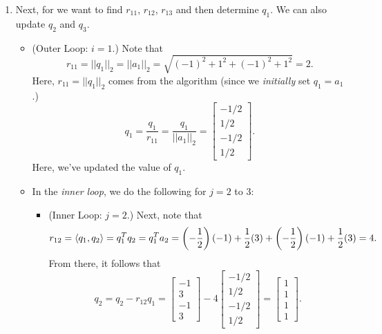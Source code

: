 \documentclass[letterpaper]{article}
\newcommand{\0}{\mathbf{0}}
\begin{document}
\begin{mdframed}
\begin{enumerate}
        \item Next, for we want to find $r_{11}$, $r_{12}$, $r_{13}$ and then determine $q_1$. We can also update $q_2$ and $q_3$. 
        
        \begin{itemize}
            \item (Outer Loop: $i = 1$.) Note that 
            \[r_{11} = ||q_1||_2 = ||a_1||_2 = \sqrt{(-1)^2 + 1^2 + (-1)^2 + 1^2} = 2.\]
            Here, $r_{11} = ||q_1||_2$ comes from the algorithm (since we \emph{initially} set $q_1 = a_1$.)
            \[q_1 = \frac{q_1}{r_{11}} = \frac{q_1}{||a_1||_2} = \begin{bmatrix}
                -1/2 \\ 1/2 \\ -1/2 \\ 1/2
            \end{bmatrix}.\]
            Here, we've updated the value of $q_1$. 
    
            \item In the \emph{inner loop}, we do the following for $j = 2$ to $3$:
            \begin{itemize}
                \item (Inner Loop: $j = 2$.) Next, note that 
                \[r_{12} = \langle q_1, q_2 \rangle = q_1^T q_2 = q_1^T a_2 = \left(-\frac{1}{2}\right)(-1) + \frac{1}{2}(3) + \left(-\frac{1}{2}\right)(-1) + \frac{1}{2}(3) = 4.\]
                From there, it follows that 
                \[q_2 = q_2 - r_{12}q_1 = \begin{bmatrix}
                    -1 \\ 3 \\ -1 \\ 3
                \end{bmatrix} - 4 \begin{bmatrix}
                    -1/2 \\ 1/2 \\ -1/2 \\ 1/2
                \end{bmatrix} = \begin{bmatrix}
                    1 \\ 1 \\ 1 \\ 1
                \end{bmatrix}.\]
        

\end{itemize}
\end{itemize}
\end{enumerate}
\end{mdframed}
\end{document}
